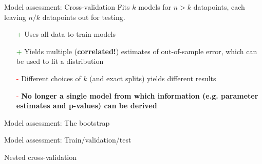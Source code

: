 \documentclass[10pt]{beamer}
\begin{document}




    \begin{frame}{Model assessment: Cross-validation}
        Fits $k$ models for $n > k$ datapoints, each leaving $n/k$ datapoints out for testing.
        \begin{itemize}
            \item[\textcolor{green}{+}] Uses all data to train models
            \item[\textcolor{green}{+}] Yields multiple (\textbf{correlated!}) estimates of out-of-sample error, which can be used to fit a distribution
            \item[\textcolor{red}{-}] Different choices of $k$ (and exact splits) yields different results
            \item[\textcolor{red}{-}] \textbf{No longer a single model from which information (e.g. parameter estimates and p-values) can be derived}
        \end{itemize}
    \end{frame}

    \begin{frame}{Model assessment: The bootstrap}
    \end{frame}

    \begin{frame}{Model assessment: Train/validation/test}
    \end{frame}

    \begin{frame}{Nested cross-validation}
    \end{frame}
\end{document}
